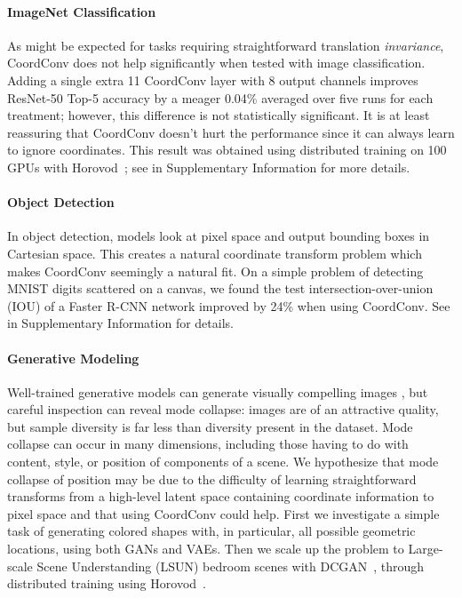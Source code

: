 \documentclass{article}
\begin{document}
\paragraph{ImageNet Classification}
As might be expected for tasks requiring straightforward translation \textit{invariance}, CoordConv does not help significantly when tested with image classification. Adding a single extra 11 CoordConv layer with 8 output channels improves ResNet-50 \cite{he-2015-arXiv-deep-residual-learning} Top-5 accuracy by a meager 0.04\% averaged over five runs for each treatment; however, this difference is not statistically significant. It is at least reassuring that CoordConv doesn't hurt the performance since it can always learn to ignore coordinates.
This result was obtained using distributed training on 100 GPUs with Horovod~\cite{sergeev-2018-arXiv-horovod:-fast-and-easy}; see  in Supplementary Information for more details.


\vspace*{-.5em}

\paragraph{Object Detection} 
In object detection, models look at pixel space and output bounding boxes in Cartesian space. This creates a natural coordinate transform problem which makes CoordConv seemingly a natural fit. On a simple problem of detecting MNIST digits scattered on a canvas, we found the test intersection-over-union (IOU) of a Faster R-CNN network improved by 24\% when using CoordConv. See  in Supplementary Information for details.

\vspace*{-.5em}

\paragraph{Generative Modeling}

Well-trained generative models can generate visually compelling images \cite{nguyen-2016-arXiv-plug-amp-play-generative,karras-2018-ICLR-progressive-growing-of-gans,stack_gan}, but careful inspection can reveal mode collapse: images are of an attractive quality, but sample diversity is far less than diversity present in the dataset. Mode collapse can occur in many dimensions, including those having to do with content, style, or position of components of a scene. We hypothesize that mode collapse of position may be due to the difficulty of learning straightforward transforms from a high-level latent space containing coordinate information to pixel space and that using CoordConv could help. First we investigate a simple task of generating colored shapes with, in particular, all possible geometric locations, using both GANs and VAEs. Then we scale up the problem to Large-scale Scene Understanding (LSUN) \cite{lsun} bedroom scenes with DCGAN~\cite{dcgan}, through distributed training using Horovod~\cite{sergeev-2018-arXiv-horovod:-fast-and-easy}.
\end{document}
